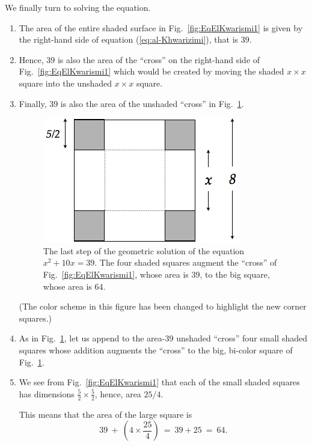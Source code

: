 We finally turn to solving the equation.
\begin{enumerate}
\item
The area of the entire shaded surface in Fig.~\ref{fig:EqElKwarismi1} is given by the right-hand side of equation (\ref{eq:al-Khwarizimi}), that is $39$.
\medskip\item
Hence, $39$ is also the area of the ``cross'' on the right-hand side of Fig.~\ref{fig:EqElKwarismi1} which would be created by moving the shaded $x \times x$ square into the unshaded $x \times x$ square.
\medskip\item
Finally, $39$ is also the area of the unshaded ``cross'' in Fig.~\ref{fig:EqElKwarismi2}.
\begin{figure}[ht]
\begin{center}
       \includegraphics[scale=0.4]{FiguresArithmetic/EquationElKwarismi2}
\caption{The last step of the geometric solution of the equation $x^2 + 10x = 39$.  The four shaded squares augment the ``cross'' of Fig.~\ref{fig:EqElKwarismi1}, whose area is $39$, to the big square, whose area is $64$.}
       \label{fig:EqElKwarismi2}
\end{center}
\end{figure}
(The color scheme in this figure has been changed to highlight the new corner squares.)

\medskip\item
As in Fig.~\ref{fig:EqElKwarismi2}, let us append to the area-$39$ unshaded ``cross'' four small shaded squares whose addition augments the ``cross'' to the big, bi-color square of
Fig.~\ref{fig:EqElKwarismi2}.

\medskip\item
We see from Fig.~\ref{fig:EqElKwarismi1} that each of the small shaded squares has dimensions $\frac{5}{2} \times \frac{5}{2}$, hence, area $25/4$.

This means that the area of the large square is
\[ 39 \ + \ \left( 4 \times \frac{25}{4} \right) \ = \ 39 + 25 \ = \ 64. \]
\end{enumerate}

